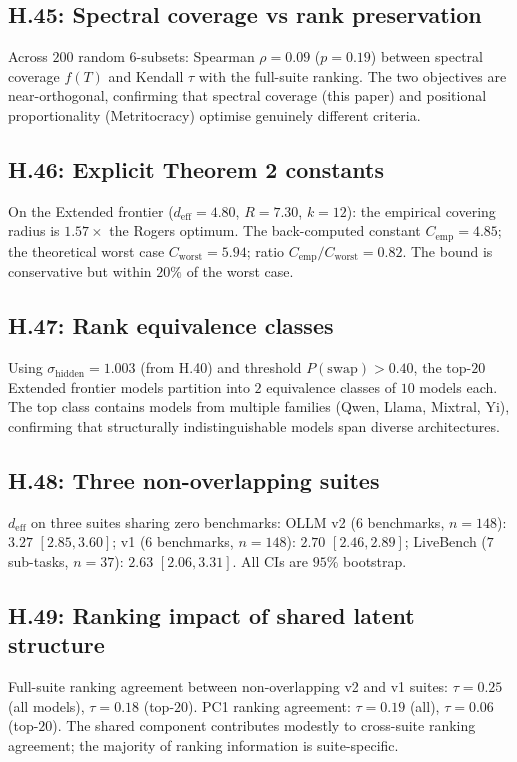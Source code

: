 \documentclass{article}
\begin{document}
\subsection*{H.45: Spectral coverage vs rank preservation}
Across $200$ random $6$-subsets: Spearman $\rho = 0.09$ ($p = 0.19$)
between spectral coverage $f(T)$ and Kendall $\tau$ with the full-suite
ranking. The two objectives are near-orthogonal, confirming that
spectral coverage (this paper) and positional proportionality
(Metritocracy) optimise genuinely different criteria.

\subsection*{H.46: Explicit Theorem 2 constants}
On the Extended frontier ($d_{\mathrm{eff}} = 4.80$, $R = 7.30$,
$k = 12$): the empirical covering radius is $1.57\times$ the Rogers
optimum. The back-computed constant $C_{\mathrm{emp}} = 4.85$;
the theoretical worst case $C_{\mathrm{worst}} = 5.94$; ratio
$C_{\mathrm{emp}} / C_{\mathrm{worst}} = 0.82$. The bound is
conservative but within $20\%$ of the worst case.

\subsection*{H.47: Rank equivalence classes}
Using $\sigma_{\mathrm{hidden}} = 1.003$ (from H.40) and threshold
$P(\mathrm{swap}) > 0.40$, the top-$20$ Extended frontier models
partition into $2$ equivalence classes of $10$ models each. The top
class contains models from multiple families (Qwen, Llama, Mixtral,
Yi), confirming that structurally indistinguishable models span
diverse architectures.

\subsection*{H.48: Three non-overlapping suites}
$d_{\mathrm{eff}}$ on three suites sharing zero benchmarks:
OLLM v2 ($6$ benchmarks, $n = 148$): $3.27$ $[2.85, 3.60]$;
v1 ($6$ benchmarks, $n = 148$): $2.70$ $[2.46, 2.89]$;
LiveBench ($7$ sub-tasks, $n = 37$): $2.63$ $[2.06, 3.31]$.
All CIs are $95\%$ bootstrap.

\subsection*{H.49: Ranking impact of shared latent structure}
Full-suite ranking agreement between non-overlapping v2 and v1 suites:
$\tau = 0.25$ (all models), $\tau = 0.18$ (top-$20$). PC1 ranking
agreement: $\tau = 0.19$ (all), $\tau = 0.06$ (top-$20$). The shared
component contributes modestly to cross-suite ranking agreement;
the majority of ranking information is suite-specific.
\end{document}
